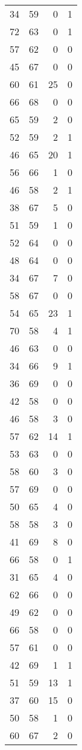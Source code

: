 \begin{tabular}{rrrr}
 34 &  59 &  0 &  1 \\
 72 &  63 &  0 &  1 \\
 57 &  62 &  0 &  0 \\
 45 &  67 &  0 &  0 \\
 60 &  61 & 25 &  0 \\
 66 &  68 &  0 &  0 \\
 65 &  59 &  2 &  0 \\
 52 &  59 &  2 &  1 \\
 46 &  65 & 20 &  1 \\
 56 &  66 &  1 &  0 \\
 46 &  58 &  2 &  1 \\
 38 &  67 &  5 &  0 \\
 51 &  59 &  1 &  0 \\
 52 &  64 &  0 &  0 \\
 48 &  64 &  0 &  0 \\
 34 &  67 &  7 &  0 \\
 58 &  67 &  0 &  0 \\
 54 &  65 & 23 &  1 \\
 70 &  58 &  4 &  1 \\
 46 &  63 &  0 &  0 \\
 34 &  66 &  9 &  1 \\
 36 &  69 &  0 &  0 \\
 42 &  58 &  0 &  0 \\
 46 &  58 &  3 &  0 \\
 57 &  62 & 14 &  1 \\
 53 &  63 &  0 &  0 \\
 58 &  60 &  3 &  0 \\
 57 &  69 &  0 &  0 \\
 50 &  65 &  4 &  0 \\
 58 &  58 &  3 &  0 \\
 41 &  69 &  8 &  0 \\
 66 &  58 &  0 &  1 \\
 31 &  65 &  4 &  0 \\
 62 &  66 &  0 &  0 \\
 49 &  62 &  0 &  0 \\
 66 &  58 &  0 &  0 \\
 57 &  61 &  0 &  0 \\
 42 &  69 &  1 &  1 \\
 51 &  59 & 13 &  1 \\
 37 &  60 & 15 &  0 \\
 50 &  58 &  1 &  0 \\
 60 &  67 &  2 &  0 \\

\end{tabular}
